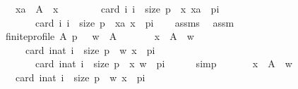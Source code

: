 \begin{isabellebody}
\ \ \ \ \ \ {\isachardoublequoteopen}{\isasymforall}xa\ {\isasymin}\ A\ {\isacharminus}{\kern0pt}\ {\isacharbraceleft}{\kern0pt}x{\isacharbraceright}{\kern0pt}{\isachardot}{\kern0pt}\isanewline
\ \ \ \ \ \ \ \ card\ {\isacharbraceleft}{\kern0pt}i{\isachardot}{\kern0pt}\ i\ {\isacharless}{\kern0pt}\ size\ p\ {\isasymand}\ {\isacharparenleft}{\kern0pt}x{\isacharcomma}{\kern0pt}\ xa{\isacharparenright}{\kern0pt}\ {\isasymin}\ p{\isacharbang}{\kern0pt}i{\isacharbraceright}{\kern0pt}\ {\isacharless}{\kern0pt}\isanewline
\ \ \ \ \ \ \ \ \ \ card\ {\isacharbraceleft}{\kern0pt}i{\isachardot}{\kern0pt}\ i\ {\isacharless}{\kern0pt}\ size\ p\ {\isasymand}\ {\isacharparenleft}{\kern0pt}xa{\isacharcomma}{\kern0pt}\ x{\isacharparenright}{\kern0pt}\ {\isasymin}\ p{\isacharbang}{\kern0pt}i{\isacharbraceright}{\kern0pt}{\isachardoublequoteclose}\isanewline
\ \ \isamarkupfalse%
\ assms\ \isamarkupfalse%
\ assm{\isacharcolon}{\kern0pt}\isanewline
\ \ \ \ {\isachardoublequoteopen}finite{\isacharunderscore}{\kern0pt}profile\ A\ p\ {\isasymand}\ \ w\ {\isasymin}\ A\ {\isasymand}\isanewline
\ \ \ \ \ \ {\isacharparenleft}{\kern0pt}{\isasymforall}x\ {\isasymin}\ A\ {\isacharminus}{\kern0pt}\ {\isacharbraceleft}{\kern0pt}w{\isacharbraceright}{\kern0pt}{\isachardot}{\kern0pt}\isanewline
\ \ \ \ \ \ \ \ card\ {\isacharbraceleft}{\kern0pt}i{\isacharcolon}{\kern0pt}{\isacharcolon}{\kern0pt}nat{\isachardot}{\kern0pt}\ i\ {\isacharless}{\kern0pt}\ size\ p\ {\isasymand}\ {\isacharparenleft}{\kern0pt}w{\isacharcomma}{\kern0pt}\ x{\isacharparenright}{\kern0pt}\ {\isasymin}\ p{\isacharbang}{\kern0pt}i{\isacharbraceright}{\kern0pt}\ {\isacharless}{\kern0pt}\isanewline
\ \ \ \ \ \ \ \ \ \ card\ {\isacharbraceleft}{\kern0pt}i{\isacharcolon}{\kern0pt}{\isacharcolon}{\kern0pt}nat{\isachardot}{\kern0pt}\ i\ {\isacharless}{\kern0pt}\ size\ p\ {\isasymand}\ {\isacharparenleft}{\kern0pt}x{\isacharcomma}{\kern0pt}\ w{\isacharparenright}{\kern0pt}\ {\isasymin}\ p{\isacharbang}{\kern0pt}i{\isacharbraceright}{\kern0pt}{\isacharparenright}{\kern0pt}{\isachardoublequoteclose}\isanewline
\ \ \ \ \isamarkupfalse%
\ simp\isanewline
\ \ \isamarkupfalse%
\isanewline
\ \ \ \ {\isachardoublequoteopen}{\isacharparenleft}{\kern0pt}{\isasymforall}x\ {\isasymin}\ A\ {\isacharminus}{\kern0pt}\ {\isacharbraceleft}{\kern0pt}w{\isacharbraceright}{\kern0pt}{\isachardot}{\kern0pt}\isanewline
\ \ \ \ \ \ card\ {\isacharbraceleft}{\kern0pt}i{\isacharcolon}{\kern0pt}{\isacharcolon}{\kern0pt}nat{\isachardot}{\kern0pt}\ i\ {\isacharless}{\kern0pt}\ size\ p\ {\isasymand}\ {\isacharparenleft}{\kern0pt}w{\isacharcomma}{\kern0pt}\ x{\isacharparenright}{\kern0pt}\ {\isasymin}\ p{\isacharbang}{\kern0pt}i{\isacharbraceright}{\kern0pt}\ {\isacharless}{\kern0pt}\isanewline

\end{isabellebody}
